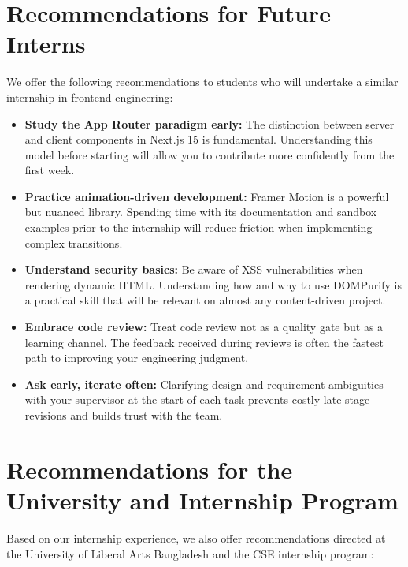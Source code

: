 \documentclass[12pt, oneside, a4paper]{book}
\begin{document}
\begin{doublespace}
\section{Recommendations for Future Interns}

We offer the following recommendations to students who will undertake a similar
internship in frontend engineering:

\begin{itemize}
  \item \textbf{Study the App Router paradigm early:} The distinction between server
  and client components in Next.js 15 is fundamental. Understanding this model before
  starting will allow you to contribute more confidently from the first week.
  \item \textbf{Practice animation-driven development:} Framer Motion is a powerful
  but nuanced library. Spending time with its documentation and sandbox examples prior
  to the internship will reduce friction when implementing complex transitions.
  \item \textbf{Understand security basics:} Be aware of XSS vulnerabilities when
  rendering dynamic HTML. Understanding how and why to use DOMPurify is a practical
  skill that will be relevant on almost any content-driven project.
  \item \textbf{Embrace code review:} Treat code review not as a quality gate but as
  a learning channel. The feedback received during reviews is often the fastest path
  to improving your engineering judgment.
  \item \textbf{Ask early, iterate often:} Clarifying design and requirement ambiguities
  with your supervisor at the start of each task prevents costly late-stage revisions
  and builds trust with the team.
\end{itemize}

\section{Recommendations for the University and Internship Program}

Based on our internship experience, we also offer recommendations directed at the
University of Liberal Arts Bangladesh and the CSE internship program:


\end{doublespace}
\end{document}
